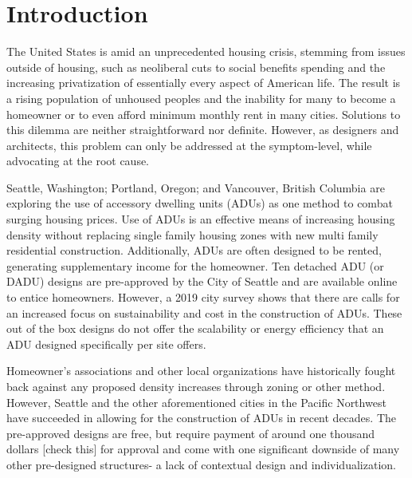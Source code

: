 \chapter{Introduction}
\label{chap:intro}

The United States is amid an unprecedented housing crisis, stemming from issues outside of housing, such as neoliberal cuts to social benefits spending and the increasing privatization of essentially every aspect of American life. The result is a rising population of unhoused peoples and the inability for many to become a homeowner or to even afford minimum monthly rent in many cities. Solutions to this dilemma are neither straightforward nor definite. However, as designers and architects, this problem can only be addressed at the symptom-level, while advocating at the root cause. 


Seattle, Washington; Portland, Oregon; and Vancouver, British Columbia are exploring the use of accessory dwelling units (ADUs) as one method to combat surging housing prices. Use of ADUs is an effective means of increasing housing density without replacing single family housing zones with new multi family residential construction. Additionally, ADUs are often designed to be rented, generating supplementary income for the homeowner. Ten detached ADU (or DADU) designs are pre-approved by the City of Seattle and are available online to entice homeowners. However, a 2019 city survey shows that there are calls for an increased focus on sustainability and cost in the construction of ADUs\cite{seattlePreapprovedPlansAccessory2019}. These out of the box designs do not offer the scalability or energy efficiency that an ADU designed specifically per site offers.


Homeowner’s associations and other local organizations have historically fought back against any proposed density increases through zoning or other method. However, Seattle and the other aforementioned cities in the Pacific Northwest have succeeded in allowing for the construction of ADUs in recent decades. The pre-approved designs are free, but require payment of around one thousand dollars [check this] for approval and come with one significant downside of many other pre-designed structures- a lack of contextual design and individualization.

